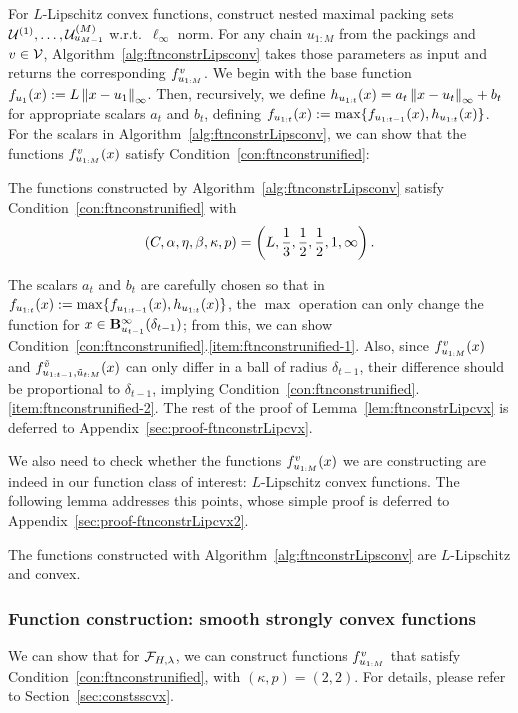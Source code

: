 For $L$-Lipschitz convex functions, construct nested maximal packing sets $\mathcal{U}^{(1)}, \dots, \mathcal{U}^{({M})}_{u_{M-1}}$ w.r.t.\ $\ell_\infty$ norm. For any chain $u_{1:M}$ from the packings and $v \in \mathcal{V}$, 
Algorithm~\ref{alg:ftnconstrLipsconv} takes those parameters as input and returns the corresponding $f_{u_{1:M}}^v$. We begin with the base function $f_{u_1}(x) := L \left\|{x - u_1}\right\|_\infty$. Then, recursively, we define $h_{u_{1:{t}}}(x) = a_t \left\|{x - u_t}\right\|_\infty + b_t$ for appropriate scalars $a_t$ and
$b_t$, defining $f_{u_{1:{t}}} (x) := \max \{ f_{u_{1:{t-1}}} (x), h_{u_{1:{t}}} (x) \}$.
For the scalars in Algorithm~\ref{alg:ftnconstrLipsconv}, we can show that the functions $f_{u_{1:M}}^v(x)$ satisfy Condition~\ref{con:ftnconstrunified}:
\begin{lemma}
	\label{lem:ftnconstrLipcvx}
	The functions constructed by Algorithm~\ref{alg:ftnconstrLipsconv} satisfy Condition~\ref{con:ftnconstrunified} with 
	\begin{equation*}
	(C, \alpha, \eta, \beta, \kappa, p) = \left (L, \frac{1}{3}, \frac{1}{2}, \frac{1}{2}, 1, \infty \right ).
	\end{equation*}
\end{lemma}
The scalars $a_t$ and $b_t$ are carefully chosen so that in $f_{u_{1:{t}}} (x) := \max \{ f_{u_{1:{t-1}}} (x), h_{u_{1:{t}}} (x) \}$, the $\max$ operation can only change the function for $x \in \mathbf{B}^\infty_{u_{t-1}}({\delta_{t-1}})$; from this, we can show Condition~\ref{con:ftnconstrunified}.\ref{item:ftnconstrunified-1}. Also, since $f_{u_{1:M}}^v(x)$ and $f_{u_{1:t-1}, \tilde u_{t:M}}^{\tilde v}(x)$ can only differ in a ball of radius $\delta_{t-1}$, their difference should be proportional to $\delta_{t-1}$, implying Condition~\ref{con:ftnconstrunified}.\ref{item:ftnconstrunified-2}. The rest of the proof of Lemma~\ref{lem:ftnconstrLipcvx} is deferred to Appendix~\ref{sec:proof-ftnconstrLipcvx}.

We also need to check whether the functions $f_{u_{1:M}}^v(x)$ we are constructing are indeed in our function class of interest:
$L$-Lipschitz convex functions. The following lemma addresses this points, whose simple proof is deferred to Appendix~\ref{sec:proof-ftnconstrLipcvx2}.
\begin{lemma}
	\label{lem:ftnconstrLipcvx2}
	The functions constructed with Algorithm~\ref{alg:ftnconstrLipsconv} are $L$-Lipschitz and convex.
\end{lemma}

\subsubsection{Function construction: smooth strongly convex functions}
We can show that for $\mathcal{F}_{H,\lambda}$, we can construct functions $f_{u_{1:M}}^v$ that satisfy Condition~\ref{con:ftnconstrunified}, with $(\kappa, p) = (2,2)$. For details, please refer to Section~\ref{sec:constsscvx}.

